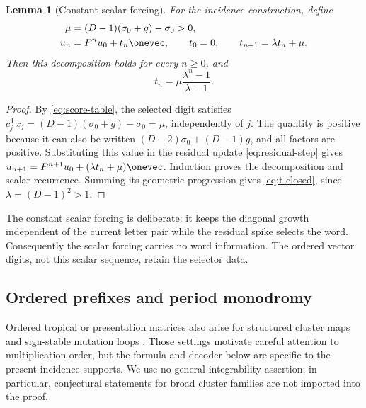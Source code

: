 \documentclass[11pt,letterpaper]{article}
\newtheorem{lemma}[theorem]{Lemma}
\theoremstyle{definition}
\theoremstyle{remark}
\numberwithin{equation}{section}
\begin{document}
\begin{lemma}[Constant scalar forcing]
\label{lem:scalar-forcing}
For the incidence construction, define
\begin{equation}
 \begin{aligned}
 \mu&=(D-1)(\sigma_0+g)-\sigma_0>0,\\
 u_n&=P^nu_0+t_n\onevec,
 \qquad t_0=0,
 \qquad t_{n+1}=\lambda t_n+\mu.
 \end{aligned}
 \label{eq:scalar-forcing}
\end{equation}
Then this decomposition holds for every \(n\geq0\), and
\begin{equation}
 t_n=\mu\frac{\lambda^n-1}{\lambda-1}.
 \label{eq:t-closed}
\end{equation}
\end{lemma}

\begin{proof}
By \eqref{eq:score-table}, the selected digit satisfies
\(c_j^{\mathsf T}x_j=(D-1)(\sigma_0+g)-\sigma_0=\mu\), independently of \(j\).
The quantity is positive because it can also be written
\((D-2)\sigma_0+(D-1)g\), and all factors are positive.  Substituting this value
in the residual update \eqref{eq:residual-step} gives
\(u_{n+1}=P^{n+1}u_0+(\lambda t_n+\mu)\onevec\).  Induction proves the
decomposition and scalar recurrence.  Summing its geometric progression
gives \eqref{eq:t-closed}, since \(\lambda=(D-1)^2>1\).
\end{proof}

The constant scalar forcing is deliberate: it keeps the diagonal growth
independent of the current letter pair while the residual spike selects the
word.  Consequently the scalar forcing carries no word information.  The
ordered vector digits, not this scalar sequence, retain the selector data.

\subsection{Ordered prefixes and period monodromy}

Ordered tropical or presentation matrices also arise for structured cluster
maps and sign-stable mutation loops
\citep{FordyHone2011,FordyHone2014,IshibashiKano2021,Kim2026}.  Those
settings motivate careful attention to multiplication order, but the formula
and decoder below are specific to the present incidence supports.  We use no
general integrability assertion; in particular, conjectural statements for
broad cluster families are not imported into the proof.
\end{document}
